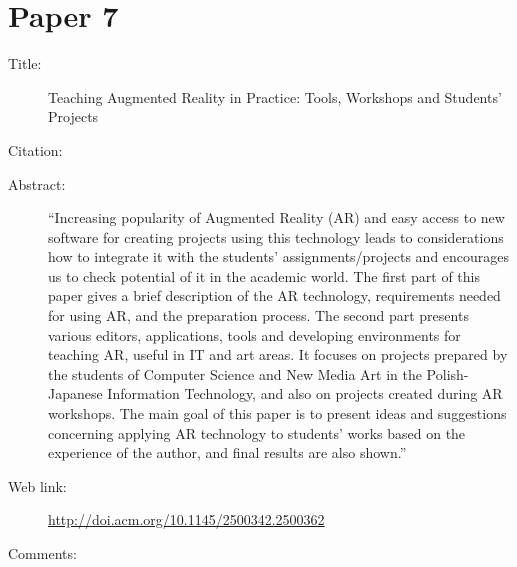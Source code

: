 \documentclass{scrartcl}
\begin{document}
	\section*{Paper 7}
	\begin{description}
		\item[Title:] Teaching Augmented Reality in Practice: Tools, Workshops and Students' Projects
		\item[Citation:] \cite{Wichrowski}
		\item[Abstract:] ``Increasing popularity of Augmented Reality (AR) and easy access to new software for creating projects using this technology leads to considerations how to integrate it with the students' assignments/projects and encourages us to check potential of it in the academic world. The first part of this paper gives a brief description of the AR technology, requirements needed for using AR, and the preparation process. The second part presents various editors, applications, tools and developing environments for teaching AR, useful in IT and art areas. It focuses on projects prepared by the students of Computer Science and New Media Art in the Polish-Japanese Information Technology, and also on projects created during AR workshops. The main goal of this paper is to present ideas and suggestions concerning applying AR technology to students' works based on the experience of the author, and final results are also shown.''
		\item[Web link:] \url{http://doi.acm.org/10.1145/2500342.2500362}
		\item[Comments:]
	\end{description}
	
\end{document}
